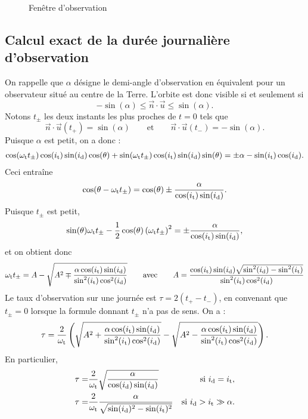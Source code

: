 \begin{figure}
\begin{center}
\scriptsize
\def\figurewidth{0.6\linewidth}

\caption{Fenêtre d'observation} \label{nicolas:fenetre}
\end{center}
\end{figure}



\subsection{Calcul exact de la durée journalière d'observation}

On rappelle que $\alpha$ désigne le demi-angle d'observation en équivalent pour un observateur situé au centre de la Terre. L'orbite est donc visible si et seulement si
\[ -\sin(\alpha) \leq \vec{n} \cdot \vec{u} \leq \sin(\alpha).\]
Notons $t_\pm$ les deux instants les plus proches de $t=0$ tels que
\[  \vec{n} \cdot \vec{u}(t_+) = \sin(\alpha) \qquad \text{et} \qquad  \vec{n} \cdot \vec{u}(t_-) = -\sin(\alpha).\] 
Puisque $\alpha$ est petit, on a donc :
\begin{multline*}
\cos(\omega_\text{t} t_\pm) \cos(i_\text{t}) \sin(i_\text{d}) \cos(\theta) + \sin(\omega_\text{t} t_\pm) \cos(i_\text{t})\sin(i_\text{d})\sin(\theta)
 = \pm\alpha -  \sin(i_\text{t})\cos(i_\text{d}).
\end{multline*}
Ceci entraîne
\[ \cos(\theta - \omega_\text{t} t_\pm) = \cos(\theta) \pm  \frac{\alpha}{\cos(i_\text{t})\sin(i_\text{d})}.\]
Puisque $t_\pm$ est petit, 
\[ \sin(\theta) \omega_\text{t} t_\pm - \frac{1}{2} \cos(\theta) \left(\omega_\text{t} t_\pm\right)^2 = \pm  \frac{\alpha}{\cos(i_\text{t})\sin(i_\text{d})},\]
et on obtient donc
\[ \omega_\text{t} t_\pm = A - \sqrt{A^2 \mp \frac{\alpha\cos(i_\text{t})\sin(i_\text{d})}{\sin^2(i_\text{t})\cos^2(i_\text{d})}} \qquad \text{avec} \qquad A=\frac{\cos(i_\text{t})\sin(i_\text{d})\sqrt{\sin^2(i_\text{d})-\sin^2(i_\text{t})}}{\sin^2(i_\text{t})\cos^2(i_\text{d})}\]
Le taux d'observation sur une journée est  $ \tau = 2(t_+ - t_-)$, en convenant que $t_\pm = 0$ lorsque la formule donnant $t_\pm$ n'a pas de sens. On a :
\[ \tau = \frac{2}{\omega_\text{t}} \left(  \sqrt{A^2 + \frac{\alpha\cos(i_\text{t})\sin(i_\text{d})}{\sin^2(i_\text{t})\cos^2(i_\text{d})}} - \sqrt{A^2 - \frac{\alpha\cos(i_\text{t})\sin(i_\text{d})}{\sin^2(i_\text{t})\cos^2(i_\text{d})}} \right).\]
En particulier,
\begin{align*}
  \tau =  &\frac{2}{\omega_\text{t}}\sqrt{\frac{\alpha}{\cos(i_\text{d})\sin(i_\text{d})}} & \text{si $i_\text{d} = i_\text{t}$}, \\
  \tau =  &\frac{2}{\omega_\text{t}}\frac{\alpha}{\sqrt{\sin(i_\text{d})^2 - \sin(i_\text{t})^2}} & \text{si $i_\text{d} > i_\text{t} \gg \alpha$}.
\end{align*}%

